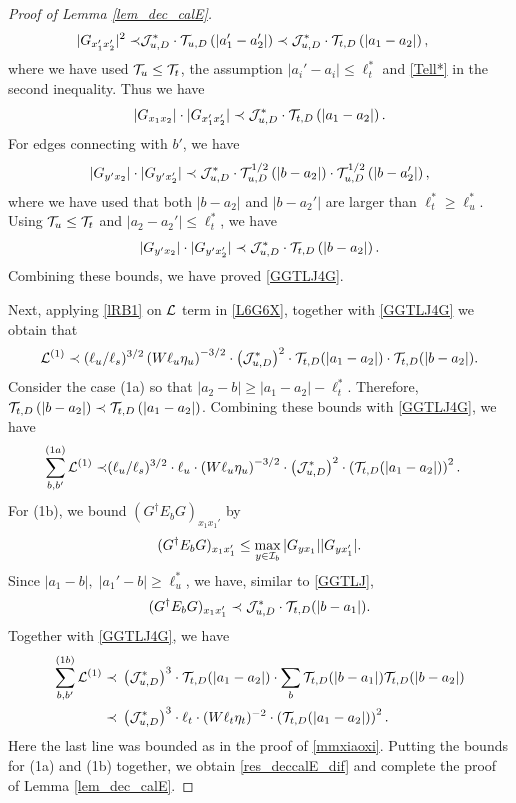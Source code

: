 \documentclass[10pt,reqno]{article}
\theoremstyle{plain} %
\theoremstyle{remark}
\numberwithin{equation}{section}
\begin{document}
\begin{proof}[Proof of Lemma \ref{lem_dec_calE}]
\begin{align}
 |G_{x_1'x_2'}|^2\prec & {\cal J}^*_{u,D}\cdot {\cal T}_{u,D}\left( |a_1'-a_2'|\right)  \prec {\cal J}^*_{u,D}\cdot {\cal T}_{t,D}\left( |a_1-a_2|\right), 
\end{align} 
where  we have used ${\cal T}_u\le {\cal T}_t$, the assumption $|a_i'-a_i|\le \ell_t^*$ and \eqref{Tell*} in the   second inequality.  Thus we have 
$$
|G_{x_1x_2}|\cdot |G_{x_1'x_2'}|\prec   {\cal J}^*_{u,D}\cdot {\cal T}_{t,D}\left( |a_1-a_2|\right).
$$ 
For edges connecting with $b'$, we have 
$$
|G_{y'x_2}|\cdot |G_{y'x_2'}| \prec 
{\cal J}^*_{u,D}\cdot  {\cal T}^{1/2}_{u,D}\left( |b-a_2| \right)\cdot   {\cal T}^{1/2}_{u,D}\left(  |b-a_2'| \right),
$$
where we have used that  both  $|b-a_2|$ and $|b-a_2'|$ are larger than $\ell_t^*\ge \ell_u^*$.
Using  ${\cal T}_u\le {\cal T}_t$ and $|a_2-a_2'|\le \ell_t^*$, we have 
$$
|G_{y'x_2}|\cdot |G_{y'x_2'}|\prec {\cal J}^*_{u,D}\cdot  {\cal T} _{t,D}\left(  |b-a_2| \right).
$$
Combining  these  bounds, we have proved \eqref{GGTLJ4G}. 

Next, applying  \eqref{lRB1} on $\cal L$ term in \eqref{L6G6X}, together with \eqref{GGTLJ4G} we obtain that 
$$
{\cal L}^{(1)}\prec (\ell_u/\ell_s)^{3/2}\left(W\ell_u\eta_u\right)^{-3/2}\cdot \left({\cal J}^*_{u,D}\right)^2\cdot 
{\cal T} _{t,D}(|a_1-a_2|)\cdot {\cal T} _{t,D}( |b-a_2|)  . 
$$
Consider the case (1a) so that   $|a_2-b|\ge |a_1-a_2|-\ell_t^*$. Therefore, ${\cal T} _{t,D}\left(  |b-a_2| \right) \prec 
{\cal T} _{t,D}\left(  |a_1-a_2| \right)$. 
Combining  these bounds  with \eqref{GGTLJ4G}, we have 
\begin{align}
  \sum_{b,b'}^{(1a)} {\cal L}^{(1)}
 \prec &(\ell_u/\ell_s)^{3/2} \cdot \ell_u \cdot\left(W \ell_u \eta_u\right)^{-3/2}
\cdot\left({\cal J}^*_{u,D}\right)^2  \cdot \left({\cal T}_{t,D}(|a_1-a_2|)\right)^2.
\end{align}
For (1b), we bound  $(G^\dagger E_bG)_{x_1x_1'}$ by 
$$
(G^\dagger E_bG)_{x_1x_1'}\le \max_{y\in {\cal I}_b}|G_{yx_1}||G_{yx'_1}|.
$$
Since  $ |a_1-b|,\; |a_1'-b| \ge \ell_u^*$,    we have, similar to \eqref{GGTLJ}, 
$$
(G^\dagger E_bG)_{x_1x_1'}
\prec {\cal J}^*_{u,D} \cdot  {\cal T}_{t,D}(|b-a_1|) .
$$
Together  with \eqref{GGTLJ4G}, we have  
\begin{align}
  \sum_{b,b'}^{(1b)} {\cal L}^{(1)}
 \prec\; & \left( {\cal J}^*_{u,D}\right)^3 \cdot  {\cal T}_{t,D}(|a_1-a_2|)\cdot \sum_b {\cal T}_{t,D}(|b-a_1|) {\cal T}_{t,D}(|b-a_2|)
 \nonumber \\
\prec \; &  \left( {\cal J}^*_{u,D}\right)^3 \cdot \ell_t \cdot (W\ell_t\eta_t)^{-2} 
\cdot \left({\cal T}_{t,D}(|a_1-a_2|)\right)^{2}.
 \end{align}
Here the last line was bounded as in the proof of \eqref{mmxiaoxi}.  Putting  the bounds for (1a) and (1b) together, we obtain \eqref{res_deccalE_dif} and complete the proof of Lemma  \ref{lem_dec_calE}. 
\end{proof}
\end{document}
